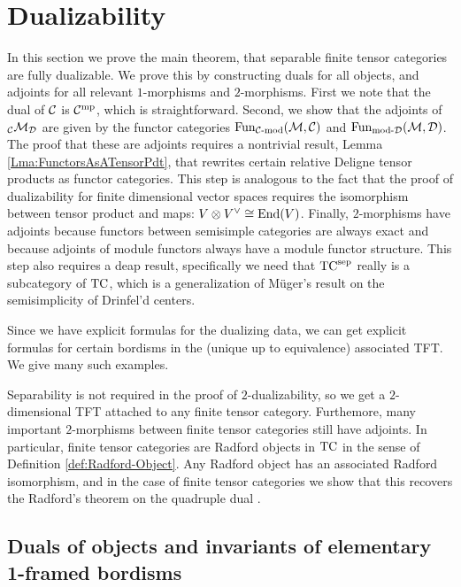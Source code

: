 \documentclass{amsart}
\begin{document}
\section{Dualizability} \label{sec:dualfusion}

In this section we prove the main theorem, that separable finite tensor categories are fully dualizable.  We prove this by constructing duals for all objects, and adjoints for all relevant $1$-morphisms and $2$-morphisms.  First we note that the dual of $\mathcal C$ is $\mathcal C^{\mathrm{mp}}$, which is straightforward.  Second, we show that the adjoints of ${}_\mathcal C \mathcal M_\mathcal D$ are given by the functor categories $\operatorname{Fun}_{{\mathcal C\text{-mod}}}(\mathcal M, \mathcal C)$ and $\operatorname{Fun}_{\text{mod-}\mathcal D}(\mathcal M, \mathcal D)$.  The proof that these are adjoints requires a nontrivial result, Lemma \ref{Lma:FunctorsAsATensorPdt}, that rewrites certain relative Deligne tensor products as functor categories.  This step is analogous to the fact that the proof of dualizability for finite dimensional vector spaces requires the isomorphism between tensor product and maps: $V \otimes V^\vee \cong \operatorname{End}(V)$.  Finally, $2$-morphisms have adjoints because functors between semisimple categories are always exact and because adjoints of module functors always have a module functor structure.  This step also requires a deap result, specifically we need that ${\mathrm{TC}^{\text{sep}}}$ really is a subcategory of $\mathrm{TC}$, which is a generalization of M\"uger's result on the semisimplicity of Drinfel'd centers.

Since we have explicit formulas for the dualizing data, we can get explicit formulas for certain bordisms in the (unique up to equivalence) associated TFT.  We give many such examples.

Separability is not required in the proof of $2$-dualizability, so we get a $2$-dimensional TFT attached to any finite tensor category.  Furthemore, many important $2$-morphisms between finite tensor categories still have adjoints.  In particular, finite tensor categories are Radford objects in $\mathrm{TC}$ in the sense of Definition \ref{def:Radford-Object}.  Any Radford object has an associated Radford isomorphism, and in the case of finite tensor categories we show that this recovers the Radford's theorem on the quadruple dual \cite{MR0407069, MR2097289}.

\subsection{Duals of objects and invariants of elementary 1-framed bordisms} \label{sec:df-objects}
\end{document}
